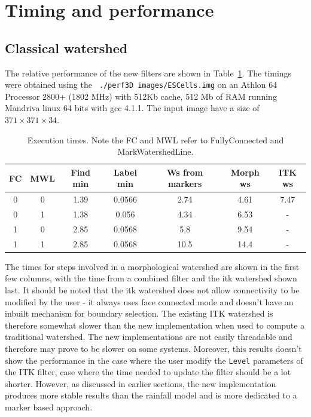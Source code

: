 \documentclass{InsightArticle}
\begin{document}
\section{Timing and performance}
\label{sect:perf}

  \subsection{Classical watershed}
\label{sect:perf-classical}

The relative performance of the new filters are shown in
Table~\ref{tbl:perf}. The timings were obtained using the {\tt
./perf3D images/ESCells.img} on an Athlon 64 
Processor 2800+ (1802 MHz) with 512Kb cache, 512 Mb of RAM running
Mandriva linux 64 bits with gcc 4.1.1. The input image have a size of
$371 \times 371 \times 34$.

\begin{table}[htbp]
\centering
\begin{tabular}{cc|ccc|cc}
\hline
FC & MWL & Find min &  Label min & Ws from markers & Morph ws &  ITK ws \\
\hline
\hline
0 &      0 &      1.39 &   0.0566 & 2.74 &   4.61 &   7.47 \\
0 &      1 &      1.38 &   0.056  & 4.34 &   6.53 &   - \\
1 &      0 &      2.85 &   0.0568 & 5.8  &   9.54 &   - \\
1 &      1 &      2.85 &   0.0568 & 10.5 &   14.4 &   - \\
\hline
\end{tabular}
\caption{Execution times. Note the FC and MWL refer to FullyConnected and MarkWatershedLine.\label{tbl:perf}}
\end{table}

The times for steps involved in a
morphological watershed are shown in the first few columns, with the
time from a combined filter and the itk watershed shown last. It
should be noted that the itk watershed does not allow connectivity to
be modified by the user - it always uses face connected mode and
doesn't have an inbuilt mechanism for boundary selection. The existing
ITK watershed is therefore somewhat slower than the new implementation
when used to compute a traditional watershed. The new implementations
are not easily threadable and therefore may prove to be slower on some
systems. Moreover, this results doesn't show the performance in the
case where the user modify the \verb$Level$ parameters of the ITK
filter, case where the time needed to update the filter should be a lot
shorter. However, as discussed in earlier sections, the new
implementation produces more stable results than the rainfall model
and is more dedicated to a marker based approach.
\end{document}
